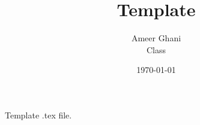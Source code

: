 \documentclass[12pt]{article}
\title{Template}
\author{Ameer Ghani\\Class}
\date{\today}
\begin{document}
\maketitle
\doublespacing
Template .tex file.
\end{document}
